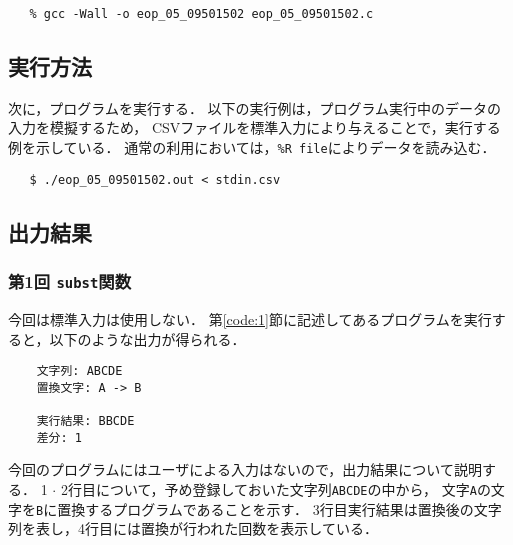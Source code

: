 \documentclass[autodetect-engine,dvi=dvipdfmx,ja=standard,
               a4j,11pt]{bxjsarticle}
\begin{document}
{\fontsize{10pt}{11pt} \selectfont
 \begin{verbatim}
   % gcc -Wall -o eop_05_09501502 eop_05_09501502.c
 \end{verbatim}
}

\subsection{実行方法}

次に，プログラムを実行する．
以下の実行例は，プログラム実行中のデータの入力を模擬するため，
CSVファイルを標準入力により与えることで，実行する例を示している．
通常の利用においては，\verb|%R file|によりデータを読み込む．

{\fontsize{10pt}{11pt} \selectfont
 \begin{verbatim}
   $ ./eop_05_09501502.out < stdin.csv
 \end{verbatim}
}

\subsection{出力結果}

\subsubsection{第1回 \texttt{subst}関数}

今回は標準入力は使用しない．
第\ref{code:1}節に記述してあるプログラムを実行すると，以下のような出力が得られる．

{\fontsize{10pt}{11pt} \selectfont
 \begin{verbatim}
    文字列: ABCDE
    置換文字: A -> B

    実行結果: BBCDE
    差分: 1
 \end{verbatim}
}

今回のプログラムにはユーザによる入力はないので，出力結果について説明する．
1 $\cdot$ 2行目について，予め登録しておいた文字列\verb|ABCDE|の中から，
文字\verb|A|の文字を\verb|B|に置換するプログラムであることを示す．
3行目実行結果は置換後の文字列を表し，4行目には置換が行われた回数を表示している．
\end{document}
